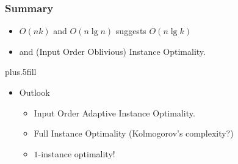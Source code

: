 \documentclass{beamer}
\begin{document}
\begin{frame}
  \frametitle<presentation>{Summary}

  \begin{itemize}
  \item $O(nk)$ and $O(n\lg n)$ suggests $O(n\lg k)$
  \item and (Input Order Oblivious) \alert{Instance Optimality}.
  \end{itemize}
  
  \vskip0pt plus.5fill
  \begin{itemize}
  \item
    Outlook
    \begin{itemize}
    \item Input Order Adaptive Instance Optimality.
    \item Full Instance Optimality (Kolmogorov's complexity?)
    \item $1$-instance optimality!
    \end{itemize}
  \end{itemize}
\end{frame}
\end{document}
